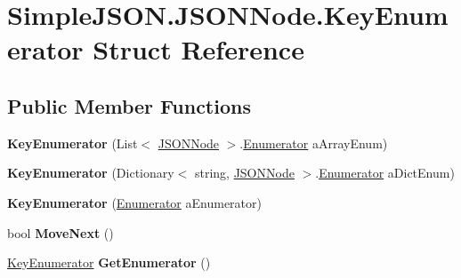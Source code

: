 \hypertarget{structSimpleJSON_1_1JSONNode_1_1KeyEnumerator}{}\section{Simple\+J\+S\+O\+N.\+J\+S\+O\+N\+Node.\+Key\+Enumerator Struct Reference}
\label{structSimpleJSON_1_1JSONNode_1_1KeyEnumerator}
\subsection*{Public Member Functions}
\begin{DoxyCompactItemize}
\item 
{\bfseries Key\+Enumerator} (List$<$ \hyperlink{classSimpleJSON_1_1JSONNode}{J\+S\+O\+N\+Node} $>$.\hyperlink{structSimpleJSON_1_1JSONNode_1_1Enumerator}{Enumerator} a\+Array\+Enum)\hypertarget{structSimpleJSON_1_1JSONNode_1_1KeyEnumerator_a76b68b145b027cca387ea233f8c883b2}{}\label{structSimpleJSON_1_1JSONNode_1_1KeyEnumerator_a76b68b145b027cca387ea233f8c883b2}

\item 
{\bfseries Key\+Enumerator} (Dictionary$<$ string, \hyperlink{classSimpleJSON_1_1JSONNode}{J\+S\+O\+N\+Node} $>$.\hyperlink{structSimpleJSON_1_1JSONNode_1_1Enumerator}{Enumerator} a\+Dict\+Enum)\hypertarget{structSimpleJSON_1_1JSONNode_1_1KeyEnumerator_aec42f848bdc5c9aacab79d2feda30cdf}{}\label{structSimpleJSON_1_1JSONNode_1_1KeyEnumerator_aec42f848bdc5c9aacab79d2feda30cdf}

\item 
{\bfseries Key\+Enumerator} (\hyperlink{structSimpleJSON_1_1JSONNode_1_1Enumerator}{Enumerator} a\+Enumerator)\hypertarget{structSimpleJSON_1_1JSONNode_1_1KeyEnumerator_af08770a44e38a54fb59f36726eedea4a}{}\label{structSimpleJSON_1_1JSONNode_1_1KeyEnumerator_af08770a44e38a54fb59f36726eedea4a}

\item 
bool {\bfseries Move\+Next} ()\hypertarget{structSimpleJSON_1_1JSONNode_1_1KeyEnumerator_ac3a47af0b78a6b3b27c044791328b970}{}\label{structSimpleJSON_1_1JSONNode_1_1KeyEnumerator_ac3a47af0b78a6b3b27c044791328b970}

\item 
\hyperlink{structSimpleJSON_1_1JSONNode_1_1KeyEnumerator}{Key\+Enumerator} {\bfseries Get\+Enumerator} ()\hypertarget{structSimpleJSON_1_1JSONNode_1_1KeyEnumerator_a003923a2b44e86c42f7c874c5332b440}{}\label{structSimpleJSON_1_1JSONNode_1_1KeyEnumerator_a003923a2b44e86c42f7c874c5332b440}

\end{DoxyCompactItemize}
